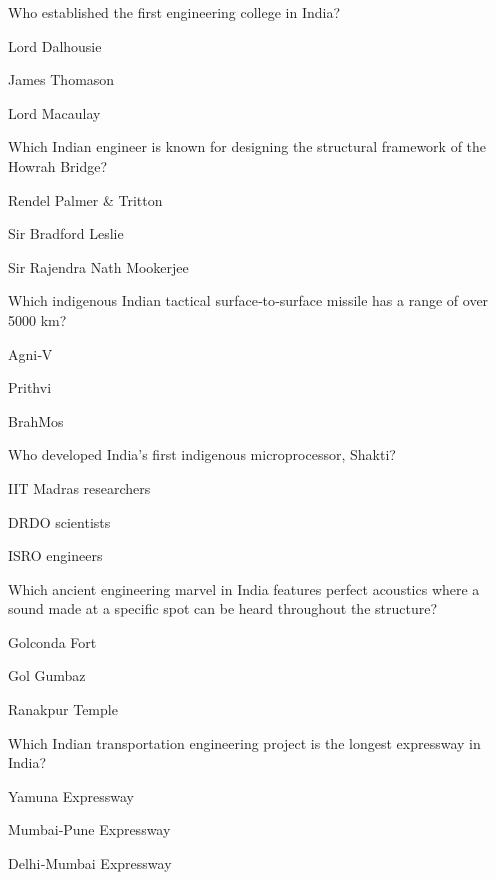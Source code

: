\begin{enhancedmcq}{Who established the first engineering college in India?}
\item Lord Dalhousie
\item James Thomason
\item Lord Macaulay

\end{enhancedmcq}
\begin{enhancedmcq}{Which Indian engineer is known for designing the structural framework of the Howrah Bridge?}
\item Rendel Palmer & Tritton
\item Sir Bradford Leslie
\item Sir Rajendra Nath Mookerjee

\end{enhancedmcq}
\begin{enhancedmcq}{Which indigenous Indian tactical surface‑to‑surface missile has a range of over 5000 km?}
\item Agni‑V
\item Prithvi
\item BrahMos

\end{enhancedmcq}
\begin{enhancedmcq}{Who developed India's first indigenous microprocessor, Shakti?}
\item IIT Madras researchers
\item DRDO scientists
\item ISRO engineers

\end{enhancedmcq}
\begin{enhancedmcq}{Which ancient engineering marvel in India features perfect acoustics where a sound made at a specific spot can be heard throughout the structure?}
\item Golconda Fort
\item Gol Gumbaz
\item Ranakpur Temple

\end{enhancedmcq}
\begin{enhancedmcq}{Which Indian transportation engineering project is the longest expressway in India?}
\item Yamuna Expressway
\item Mumbai‑Pune Expressway
\item Delhi‑Mumbai Expressway

\end{enhancedmcq}
